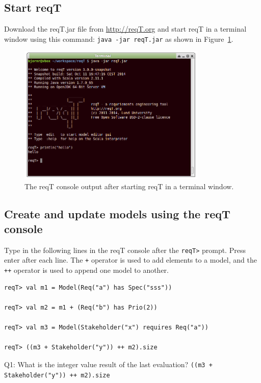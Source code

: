 \documentclass[11pt]{article}
\begin{document}
\subsection{Start reqT}
Download the reqT.jar file from \url{http://reqT.org} and start reqT in a terminal window using this command: \verb+java -jar reqT.jar+ as shown in Figure~\ref{fig:console}.

\begin{figure}[h]
    \centering
    \includegraphics[width=0.8\textwidth]{console.png}
    \caption{The reqT console output after starting reqT in a terminal window.}
    \label{fig:console}
\end{figure}

\subsection{Create and update models using the reqT console}
Type in the following lines in the reqT console after the \verb+reqT>+ prompt. Press enter after each line. The \verb?+? operator is used to add elements to a model, and the  \verb?++? operator is used to append one model to another.

{\small\begin{verbatim}
reqT> val m1 = Model(Req("a") has Spec("sss"))

reqT> val m2 = m1 + (Req("b") has Prio(2))

reqT> val m3 = Model(Stakeholder("x") requires Req("a"))

reqT> ((m3 + Stakeholder("y")) ++ m2).size
\end{verbatim}}

\begin{framed}\noindent
Q1: What is the integer value result of the last evaluation? 
\newline 
\verb?((m3 + Stakeholder("y")) ++ m2).size?
\newline
\newline \underline{\hspace{11.9cm}}
\end{framed}
\end{document}
